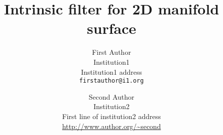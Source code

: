 \documentclass[10pt,twocolumn,letterpaper]{article}
\begin{document}
\title{Intrinsic filter for 2D manifold surface}

\author{First Author\\
Institution1\\
Institution1 address\\
{\tt\small firstauthor@i1.org}
\and
Second Author\\
Institution2\\
First line of institution2 address\\
{\small\url{http://www.author.org/~second}}
}

\maketitle






%


{\small


}
\end{document}

